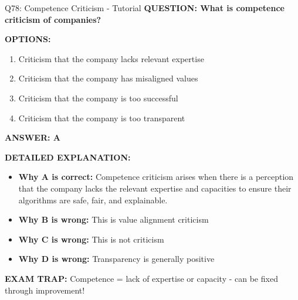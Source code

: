 \documentclass[8pt]{beamer}
\begin{document}
	\begin{frame}{Q78: Competence Criticism - Tutorial}
		\fontsize{6.5}{7.5}\selectfont
		\textbf{QUESTION: What is competence criticism of companies?}
		
		\vspace{0.1cm}
		\textbf{OPTIONS:}
		\begin{enumerate}
			\item Criticism that the company lacks relevant expertise
			\item Criticism that the company has misaligned values
			\item Criticism that the company is too successful
			\item Criticism that the company is too transparent
		\end{enumerate}
		
		\vspace{0.1cm}
		\textcolor{myblue}{\textbf{ANSWER: A}}
		
		\vspace{0.1cm}
		\textbf{DETAILED EXPLANATION:}
		\begin{itemize}
			\item \textbf{Why A is correct:} Competence criticism arises when there is a perception that the company lacks the relevant expertise and capacities to ensure their algorithms are safe, fair, and explainable.
			\item \textbf{Why B is wrong:} This is value alignment criticism
			\item \textbf{Why C is wrong:} This is not criticism
			\item \textbf{Why D is wrong:} Transparency is generally positive
		\end{itemize}
		
		\textcolor{myred}{\textbf{EXAM TRAP:}} Competence = \textcolor{myblue}{lack of expertise or capacity} - can be fixed through improvement!
	\end{frame}
	
\end{document}
